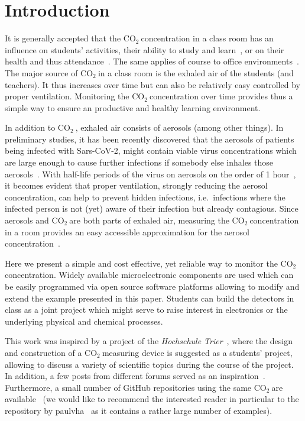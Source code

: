 \documentclass[12pt,a4paper]{article}
\newcommand{\coo}{\ensuremath{\mathrm{CO_2}~}}
\begin{document}
\section{Introduction}\label{s:intro}
It is generally accepted that the \coo concentration in a class room has an influence on students' activities, their ability to study and learn~\cite{TWARDELLA2012,GAIHRE2014}, or on their health and thus attendance~\cite{SHENDELL2004}. The same applies of course to office environments~\cite{ALLEN2016}. The major source of \coo in a class room is the exhaled air of the students (and teachers). It thus increases over time but can also be relatively easy controlled by proper ventilation. Monitoring the \coo concentration over time provides thus a simple way to ensure an productive and healthy learning environment. 

In addition to \coo, exhaled air consists of aerosols (among other things). In preliminary studies, it has been recently discovered that the aerosols of patients being infected with Sars-CoV-2, might contain viable virus concentrations which are large enough to cause further infections if somebody else inhales those aerosols~\cite{LEDNICKY2020,MORAWSKA2020,KOHANSKI2020}. With half-life periods of the virus on aerosols on the order of 1 hour~\cite{DOREMALEN2020}, it becomes evident that proper ventilation, strongly reducing the aerosol concentration, can help to prevent hidden infections, i.e.\ infections where the infected person is not (yet) aware of their infection but already contagious. Since aerosols and \coo are both parts of exhaled air, measuring the \coo concentration in a room provides an easy accessible approximation for the aerosol concentration~\cite{HARTMANN2020}.

Here we present a simple and cost effective, yet reliable way to monitor the \coo concentration. Widely available microelectronic components are used which can be easily programmed via open source software platforms allowing to modify and extend the example presented in this paper. Students can build the detectors in class as a joint project which might serve to raise interest in electronics or the underlying physical and chemical processes. 

This work was inspired by a project of the \textit{Hochschule Trier}~\cite{BIRKENFELD2020}, where the design and construction of a \coo measuring device is suggested as a students' project, allowing to discuss a variety of scientific topics during the course of the project. In addition, a few posts from different forums served as an inspiration~\cite{BOYLES2020,METROPOL2020,OMBRA2020,ZENTRIS2020}. Furthermore, a small number of GitHub repositories using the same \coo are available~\cite{MKETZ2020,NETZBASTELN2020,PAULVHA2020} (we would like to recommend the interested reader in particular to the repository by paulvha~\cite{PAULVHA2020} as it contains a rather large number of examples).
\end{document}
